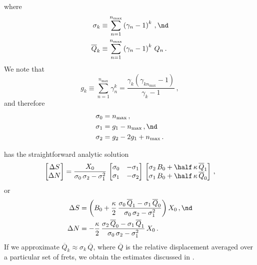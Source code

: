 where
 \begin{align}
\sigma_k &\equiv \sum_{n = 1}^{n_\text{max}} \left(\gamma_n - 1\right)^k\, , \nd \\
\overline{Q}_k &\equiv \sum_{n = 1}^{n_\text{max}} \left(\gamma_n - 1\right)^k\, Q_n\, .
 \end{align}
We note that
\begin{equation}
  g_k \equiv \sum_{n = 1}^{n_\text{max}} \gamma_n^k = \frac{\gamma_k \left(\gamma_{k n_\text{max}} - 1\right)}{\gamma_k - 1}\, ,
\end{equation}
and therefore
\begin{subequations}
  \begin{align}
    \sigma_0 &= n_\text{max}\, ,\\
    \sigma_1 &= g_1 - n_\text{max}\, , \nd \\
    \sigma_2 &= g_2 - 2 g_1 + n_\text{max}\, .
  \end{align}
\end{subequations}

  has the straightforward analytic solution
\begin{equation}
  \begin{bmatrix}
    \Delta S \\
    \Delta N
  \end{bmatrix} = \frac{X_0}{\sigma_0\, \sigma_2 - \sigma_1^2}\,
  \begin{bmatrix}
    \sigma_0 & -\sigma_1 \\
    \sigma_1 & -\sigma_2
  \end{bmatrix}\,
  \begin{bmatrix}
    \sigma_2\, B_0 + \half\, \kappa\, \overline{Q}_1 \\
    \sigma_1\, B_0 + \half\, \kappa\, \overline{Q}_0
  \end{bmatrix}\, ,
\end{equation}
or
\begin{subequations} \label{eqn:rms_sol}
  \begin{align}
    \label{eqn:rms_sol_ds} \Delta S &= \left(B_0 + \frac{\kappa}{2}\, \frac{\sigma_0\, \overline{Q}_1 - \sigma_1\, \overline{Q}_0}{\sigma_0\, \sigma_2 - \sigma_1^2} \right) X_0\, , \nd \\
    \label{eqn:rms_sol_dn} \Delta N &= -\frac{\kappa}{2}\, \frac{\sigma_2\, \overline{Q}_0 - \sigma_1\, \overline{Q}_1}{\sigma_0\, \sigma_2 - \sigma_1^2}\, X_0\, .
  \end{align}
\end{subequations}
If we approximate $\overline{Q}_k \approx \sigma_k\, \overline{Q}$, where $\overline{Q}$ is the relative displacement averaged over a particular set of frets, we obtain the estimates discussed in .

